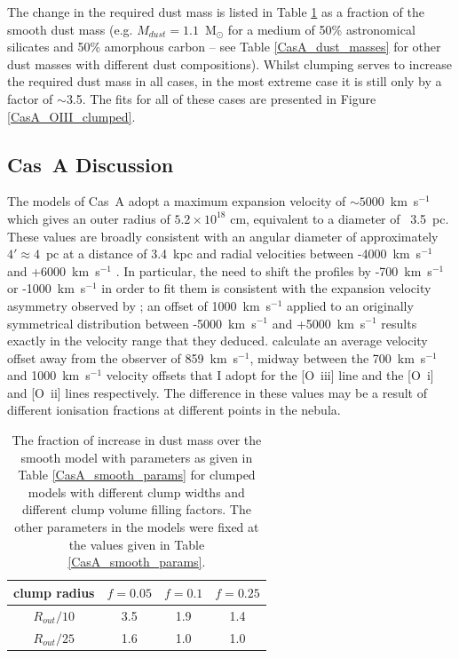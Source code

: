 The change in the required dust mass is listed in Table \ref{CasA_clumped_dust_masses} as a fraction of the smooth dust mass (e.g. $M_{dust}=1.1$~M$_{\odot}$ for a medium of 50\% astronomical silicates and 50\% amorphous carbon -- see Table \ref{CasA_dust_masses} for other dust masses with different dust compositions).  Whilst clumping serves to increase the required dust mass in all cases, in the most extreme case it is still only by a factor of $\sim$3.5.  The fits for all of these cases are presented in Figure \ref{CasA_OIII_clumped}.

\subsection{Cas~A Discussion}

The models of Cas~A adopt a maximum expansion velocity of $\sim5000$~km~s$^{-1}$ which gives an outer radius of  $5.2\times10^{18}$ cm, equivalent to a diameter of ~3.5~pc.   These values are broadly consistent with an angular diameter of approximately $4'\approx4$~pc at a distance of 3.4~kpc \citep{Reed1995,Hurford1996} and radial velocities between -4000~km~s$^{-1}$ and +6000~km~s$^{-1}$ \citep{DeLaney2010}.  In particular, the need to shift the profiles by -700~km~s$^{-1}$ or -1000~km~s$^{-1}$ in order to fit them is consistent with the expansion velocity asymmetry observed by \citet{DeLaney2010}; an offset of 1000~km~s$^{-1}$ applied to an originally symmetrical distribution between -5000~km~s$^{-1}$ and +5000~km~s$^{-1}$ results exactly in the velocity range that they deduced.  \citet{DeLaney2010} calculate an average velocity offset away from the observer of 859~km~s$^{-1}$, midway between the 700~km~s$^{-1}$ and 1000~km~s$^{-1}$  velocity offsets that I adopt for the [O~{\sc iii}] line and the [O~{\sc i}] and [O~{\sc ii}] lines respectively.  The difference in these values may be a result of different ionisation fractions at different points in the nebula.

\begin{table}
\caption{The fraction of increase in dust mass over the smooth model with parameters as given in Table \ref{CasA_smooth_params} for clumped models with different clump widths and different clump volume filling factors.  The other parameters in the models were fixed at the values given in Table \ref{CasA_smooth_params}.}
\centering
\begin{tabular}{c  c c c}
\hline
clump radius & $f=0.05$ &$f=0.1$&$f=0.25$\\
\hline
$R_{out}/10$ & 3.5 & 1.9 & 1.4 \\
$R_{out}/25$ & 1.6 & 1.0 & 1.0 \\
\hline
\end{tabular}
\label{CasA_clumped_dust_masses}
\end{table}

